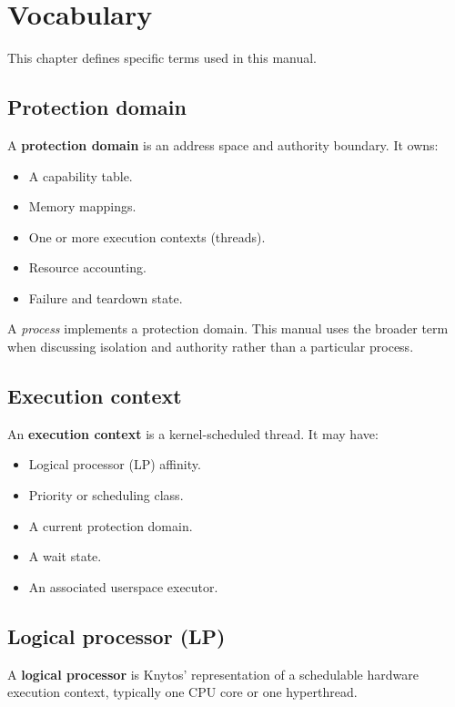 \chapter{Vocabulary}
\label{chap:vocabulary}

This chapter defines specific terms used in this manual.

\section{Protection domain}

A \textbf{protection domain} is an address space and authority boundary. It owns:

\begin{itemize}
    \item A capability table.
    \item Memory mappings.
    \item One or more execution contexts (threads).
    \item Resource accounting.
    \item Failure and teardown state.
\end{itemize}

A \emph{process} implements a protection domain. This manual uses the broader
term when discussing isolation and authority rather than a particular process.

\section{Execution context}

An \textbf{execution context} is a kernel-scheduled thread. It may have:

\begin{itemize}
    \item Logical processor (LP) affinity.
    \item Priority or scheduling class.
    \item A current protection domain.
    \item A wait state.
    \item An associated userspace executor.
\end{itemize}

\section{Logical processor (LP)}

A \textbf{logical processor} is Knytos' representation of a schedulable
hardware execution context, typically one CPU core or one hyperthread.

